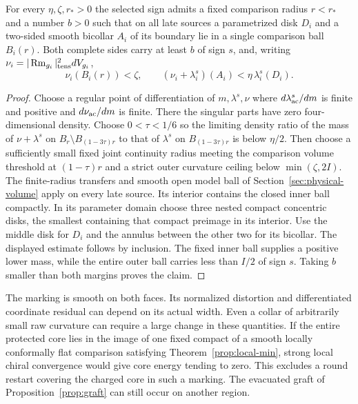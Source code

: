 \begin{corollary}
\label{cor:thin-raw-collar}
For every \(\eta,\zeta,r_*>0\) the selected sign admits a fixed
comparison radius \(r<r_*\) and a number \(b>0\) such that on all
late sources a parametrized disk \(D_i\) and a two-sided smooth
bicollar \(A_i\) of its boundary lie in a single comparison ball
\(B_i(r)\). Both complete sides carry at least \(b\) of sign \(s\),
and, writing \(\nu_i=|\operatorname{Rm}_{g_i}|_{\rm tens}^2dV_{g_i}\),
\[
 \nu_i(B_i(r))<\zeta,\qquad
 (\nu_i+\lambda_i^s)(A_i)<\eta\,\lambda_i^s(D_i).
\]
\end{corollary}
\begin{proof}
Choose a regular point of differentiation of \(m,\lambda^s,\nu\)
where \(d\lambda^s_{\rm ac}/dm\) is finite and positive and
\(d\nu_{\rm ac}/dm\) is finite. There the singular parts have zero
four-dimensional density. Choose \(0<\tau<1/6\) so the limiting
density ratio of the mass of \(\nu+\lambda^s\) on
\(B_r\setminus B_{(1-3\tau)r}\) to that of \(\lambda^s\) on
\(B_{(1-3\tau)r}\) is below \(\eta/2\). Then choose a sufficiently
small fixed joint continuity radius meeting the comparison volume
threshold at \((1-\tau)r\) and a strict outer curvature ceiling
below \(\min(\zeta,2I)\). The finite-radius transfers and smooth
open model ball of Section~\ref{sec:physical-volume} apply on
every late source. Its interior contains the closed inner ball
compactly. In its parameter domain choose three nested compact
concentric disks, the smallest containing that compact preimage
in its interior. Use the middle disk for \(D_i\) and the annulus
between the other two for its bicollar. The displayed estimate
follows by inclusion. The fixed inner ball supplies a positive
lower mass, while the entire outer ball carries less than \(I/2\)
of sign \(s\). Taking \(b\) smaller than both margins proves the claim.
\end{proof}

The marking is smooth on both faces. Its normalized distortion and
differentiated coordinate residual can depend on its actual width.
Even a collar of arbitrarily small raw curvature can require a large
change in these quantities. If the entire protected core lies in
the image of one fixed compact of a smooth locally conformally flat
comparison satisfying Theorem~\ref{prop:local-min}, strong
local chiral convergence would give core energy tending to zero.
This excludes a round restart covering the charged core in such
a marking. The evacuated graft of Proposition~\ref{prop:graft}
can still occur on another region.
